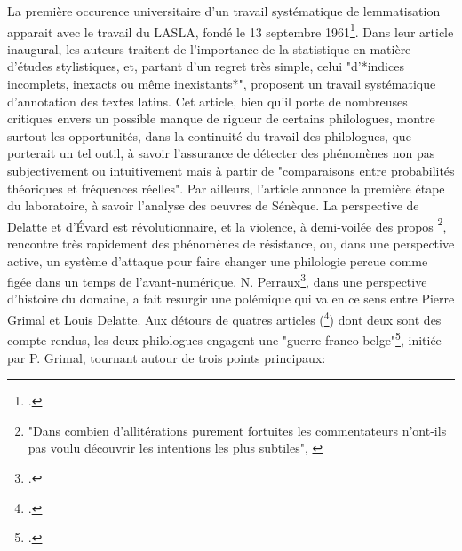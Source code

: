 La première occurence universitaire d'un travail systématique de lemmatisation apparait avec le travail du LASLA, fondé le 13 septembre 1961\footcite{delatte_laboratoire_1961}. Dans leur article inaugural, les auteurs traitent de l'importance de la statistique en matière d'études stylistiques, et, partant d'un regret très simple, celui "d'*indices incomplets, inexacts ou même inexistants*", proposent un travail systématique d'annotation des textes latins. Cet article, bien qu'il porte de nombreuses critiques envers un possible manque de rigueur de certains philologues, montre surtout les opportunités, dans la continuité du travail des philologues, que porterait un tel outil, à savoir l'assurance de détecter des phénomènes non pas subjectivement ou intuitivement mais à partir de "comparaisons entre probabilités théoriques et fréquences réelles". Par ailleurs, l'article annonce la première étape du laboratoire, à savoir l'analyse des oeuvres de Sénèque. La perspective de Delatte et d'Évard est révolutionnaire, et la violence, à demi-voilée des propos \footnote{"Dans combien d'allitérations purement fortuites les commentateurs n'ont-ils pas voulu découvrir les intentions les plus subtiles", \cite[p.~442]{delatte_laboratoire_1961}}, rencontre très rapidement des phénomènes de résistance, ou, dans une perspective active, un système d'attaque pour faire changer une philologie percue comme figée dans un temps de l'avant-numérique. N. Perraux\footcite{perreaux_lemmatisation_2019}, dans une perspective d'histoire du domaine, a fait resurgir une polémique qui va en ce sens entre Pierre Grimal et Louis Delatte. Aux détours de quatres articles (\footcites{grimal_delatte_1964}{delatte_propos_1965}{grimal_index_1966}{delatte_index_1968}) dont deux sont des compte-rendus, les deux philologues engagent une "guerre franco-belge"\footcite{verdiere_pierre_1970}, initiée par P. Grimal, tournant autour de trois points principaux:
